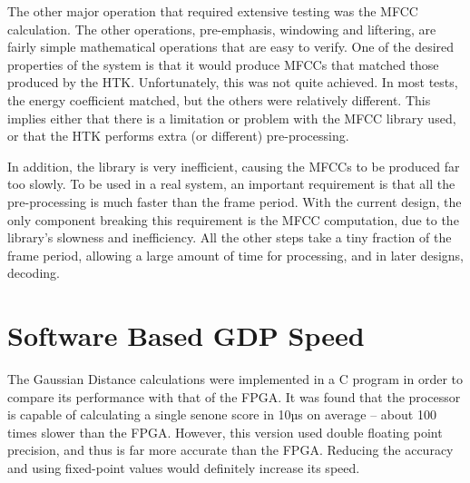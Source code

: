 	The other major operation that required extensive testing was the MFCC calculation.  The other operations, pre-emphasis, windowing and liftering, are fairly simple mathematical operations that are easy to verify.  One of the desired properties of the system is that it would produce MFCCs that matched those produced by the HTK. Unfortunately, this was not quite achieved.  In most tests, the energy coefficient matched, but the others were relatively different.  This implies either that there is a limitation or problem with the MFCC library used, or that the HTK performs extra (or different) pre-processing.

	In addition, the library is very inefficient, causing the MFCCs to be produced far too slowly.  To be used in a real system, an important requirement is that all the pre-processing is much faster than the frame period.  With the current design, the only component breaking this requirement is the MFCC computation, due to the library's slowness and inefficiency.  All the other steps take a tiny fraction of the frame period, allowing a large amount of time for processing, and in later designs, decoding.

\section{Software Based GDP Speed} %
\label{sec:software_based_gdp_speed_testing}
	The Gaussian Distance calculations were implemented in a C program in order to compare its performance with that of the FPGA.  It was found that the processor is capable of calculating a single senone score in 10µs on average -- about 100 times slower than the FPGA.  However, this version used double floating point precision, and thus is far more accurate than the FPGA.  Reducing the accuracy and using fixed-point values would definitely increase its speed.  %




% 

